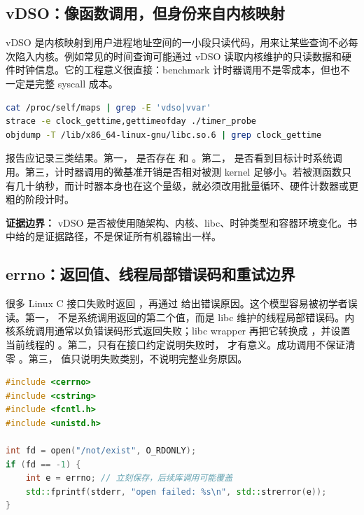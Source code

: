 \subsection{vDSO：像函数调用，但身份来自内核映射}

vDSO 是内核映射到用户进程地址空间的一小段只读代码，用来让某些查询不必每次陷入内核。例如常见的时间查询可能通过 vDSO 读取内核维护的只读数据和硬件时钟信息。它的工程意义很直接：benchmark 计时器调用不是零成本，但也不一定是完整 syscall 成本。

\begin{lstlisting}[language=bash,caption={观察 vDSO 和计时器路径}]
cat /proc/self/maps | grep -E 'vdso|vvar'
strace -e clock_gettime,gettimeofday ./timer_probe
objdump -T /lib/x86_64-linux-gnu/libc.so.6 | grep clock_gettime
\end{lstlisting}

报告应记录三类结果。第一， 是否存在 \code{[vdso]} 和 \code{[vvar]}。第二， 是否看到目标计时系统调用。第三，计时器调用的微基准开销是否相对被测 kernel 足够小。若被测函数只有几十纳秒，而计时器本身也在这个量级，就必须改用批量循环、硬件计数器或更粗的阶段计时。

\begin{warningbox}
\textbf{证据边界：} vDSO 是否被使用随架构、内核、libc、时钟类型和容器环境变化。书中给的是证据路径，不是保证所有机器输出一样。
\end{warningbox}

\subsection{errno：返回值、线程局部错误码和重试边界}

很多 Linux C 接口失败时返回 ，再通过  给出错误原因。这个模型容易被初学者误读。第一， 不是系统调用返回的第二个值，而是 libc 维护的线程局部错误码。内核系统调用通常以负错误码形式返回失败；libc wrapper 再把它转换成 ，并设置当前线程的 。第二，只有在接口约定说明失败时， 才有意义。成功调用不保证清零 。第三， 值只说明失败类别，不说明完整业务原因。

\begin{lstlisting}[language=C++,caption={errno 只在失败后读取}]
#include <cerrno>
#include <cstring>
#include <fcntl.h>
#include <unistd.h>

int fd = open("/not/exist", O_RDONLY);
if (fd == -1) {
    int e = errno; // 立刻保存，后续库调用可能覆盖
    std::fprintf(stderr, "open failed: %s\n", std::strerror(e));
}
\end{lstlisting}

